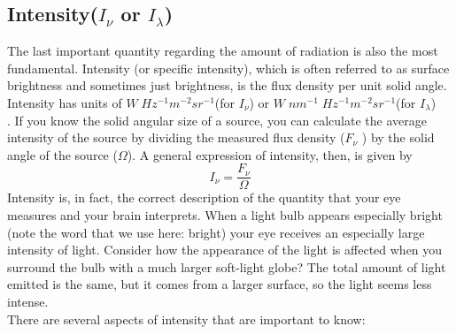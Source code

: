 \documentclass[10pt]{report}
\begin{document}
\subsection{Intensity($I_\nu$ or $I_\lambda$)}
The last important quantity regarding the amount of radiation is also the most fundamental.  Intensity (or specific intensity), which is often referred to as surface brightness and sometimes just brightness, is the flux density per unit solid angle.\\
Intensity has units of $W\;Hz^{-1}m^{-2}sr^{-1}$(for $I_\nu$) or $W\;nm^{-1}\;Hz^{-1}m^{-2}sr^{-1}$(for $I_\lambda$)\\.
If you know the solid angular size of a source, you can calculate the average intensity of the source by dividing the measured flux density ($F_\nu$ ) by the solid angle of the source ($\Omega$).  A general expression of intensity, then, is given by
\begin{equation}
I_\nu=\frac{F_\nu}{\Omega}
\end{equation}
 Intensity is, in fact, the correct description of the quantity that your eye measures and your brain interprets.  When a light bulb appears especially bright (note the word that we use here: bright) your eye receives an especially large intensity of light.  Consider how the appearance of the light is affected when you surround the bulb with a much larger soft-light globe?  The total amount of light emitted is the same, but it comes from a larger surface, so the light seems less intense. \\
 There are several aspects of intensity that are important to know:
\end{document}
